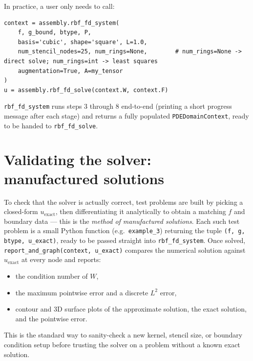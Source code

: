 \documentclass[11pt]{article}
\begin{document}
In practice, a user only needs to call:

\begin{lstlisting}
context = assembly.rbf_fd_system(
    f, g_bound, btype, P,
    basis='cubic', shape='square', L=1.0,
    num_stencil_nodes=25, num_rings=None,        # num_rings=None -> direct solve; num_rings=int -> least squares
    augmentation=True, A=my_tensor
)
u = assembly.rbf_fd_solve(context.W, context.F)
\end{lstlisting}

\texttt{rbf\_fd\_system} runs steps 3 through 8 end-to-end (printing a
short progress message after each stage) and returns a fully populated
\texttt{PDEDomainContext}, ready to be handed to \texttt{rbf\_fd\_solve}.

\section{Validating the solver: manufactured solutions}

To check that the solver is actually correct, test problems are
built by picking a closed-form $u_{\text{exact}}$, then differentiating
it analytically to obtain a matching $f$ and boundary data --- this is
the \emph{method of manufactured solutions}. Each such test problem is
a small Python function (e.g.\ \texttt{example\_3}) returning the
tuple \texttt{(f, g, btype, u\_exact)}, ready to be passed straight into
\texttt{rbf\_fd\_system}. Once solved, \texttt{report\_and\_graph(context,
u\_exact)} compares the numerical solution against $u_{\text{exact}}$
at every node and reports:

\begin{itemize}[leftmargin=2em]
  \item the condition number of $W$,
  \item the maximum pointwise error and a discrete $L^2$ error,
  \item contour and 3D surface plots of the approximate solution, the
        exact solution, and the pointwise error.
\end{itemize}

This is the standard way to sanity-check a new kernel, stencil size,
or boundary condition setup before trusting the solver on a problem
without a known exact solution.
\end{document}
